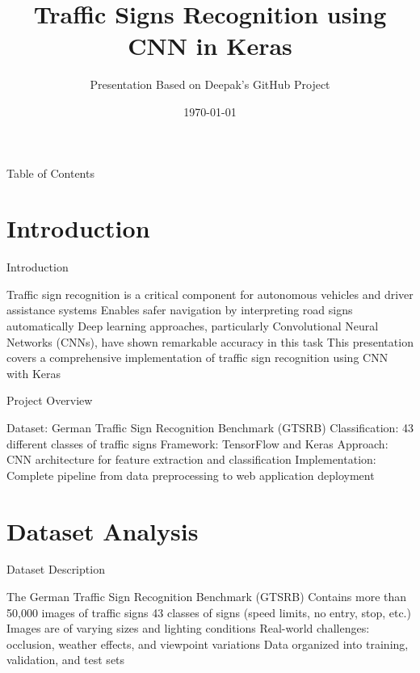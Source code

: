 \documentclass{beamer}
\title{Traffic Signs Recognition using CNN in Keras}
\author{Presentation Based on Deepak's GitHub Project}
\date{\today}
\begin{document}
\begin{frame}
\titlepage
\end{frame}

\begin{frame}{Table of Contents}
\tableofcontents
\end{frame}

\section{Introduction}

\begin{frame}{Introduction}
\begin{itemize}
    Traffic sign recognition is a critical component for autonomous vehicles and driver assistance systems
    Enables safer navigation by interpreting road signs automatically
    Deep learning approaches, particularly Convolutional Neural Networks (CNNs), have shown remarkable accuracy in this task
    This presentation covers a comprehensive implementation of traffic sign recognition using CNN with Keras
\end{itemize}
\end{frame}

\begin{frame}{Project Overview}
\begin{itemize}
    {Dataset}: German Traffic Sign Recognition Benchmark (GTSRB)
    {Classification}: 43 different classes of traffic signs
    {Framework}: TensorFlow and Keras
    {Approach}: CNN architecture for feature extraction and classification
    {Implementation}: Complete pipeline from data preprocessing to web application deployment
\end{itemize}
\end{frame}

\section{Dataset Analysis}

\begin{frame}{Dataset Description}
\begin{itemize}
    The German Traffic Sign Recognition Benchmark (GTSRB)
    Contains more than 50,000 images of traffic signs
    43 classes of signs (speed limits, no entry, stop, etc.)
    Images are of varying sizes and lighting conditions
    Real-world challenges: occlusion, weather effects, and viewpoint variations
    Data organized into training, validation, and test sets
\end{itemize}
\end{frame}
\end{document}
